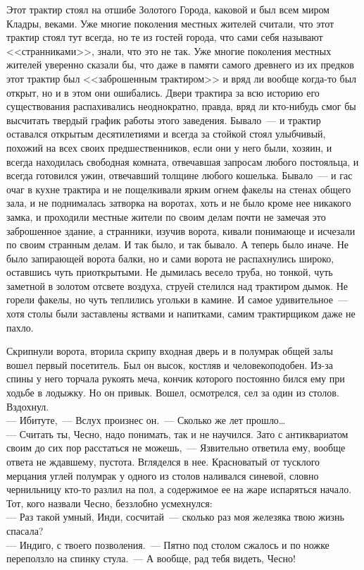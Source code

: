 Этот трактир стоял на отшибе Золотого Города, каковой и был всем миром Кладры, 
веками. Уже многие поколения местных жителей считали, что этот трактир стоял 
тут всегда, но те из гостей города, что сами себя называют <<странниками>>, знали, 
что это не так. Уже многие поколения местных жителей уверенно сказали бы, что даже 
в памяти самого древнего из их предков этот трактир был <<заброшенным трактиром>> 
и вряд ли вообще когда-то был открыт, но и в этом они ошибались. Двери трактира 
за всю историю его существования распахивались неоднократно, правда, вряд ли 
кто-нибудь смог бы высчитать твердый график работы этого заведения. Бывало~--- 
и трактир оставался открытым десятилетиями и всегда за стойкой стоял улыбчивый, 
похожий на всех своих предшественников, если они у него были, хозяин, и всегда 
находилась свободная комната, отвечавшая запросам любого постояльца, и всегда 
готовился ужин, отвечавший толщине любого кошелька. Бывало~--- и гас очаг в 
кухне трактира и не пощелкивали ярким огнем факелы на стенах общего зала, и не 
поднималась затворка на воротах, хоть и не было кроме нее никакого замка, и 
проходили местные жители по своим делам почти не замечая это заброшенное 
здание, а странники, изучив ворота, кивали понимающе и исчезали по своим странным 
делам. И так было, и так бывало. А теперь было иначе. Не было запирающей ворота балки, 
но и сами ворота не распахнулись широко, оставшись чуть приоткрытыми. Не 
дымилась весело труба, но тонкой, чуть заметной в золотом отсвете воздуха, 
струей стелился над трактиром дымок. Не горели факелы, но чуть теплились 
угольки в камине. И самое удивительное~--- хотя столы были заставлены яствами и 
напитками, самим трактирщиком даже не пахло.

Скрипнули ворота, вторила скрипу входная дверь и в полумрак общей залы вошел 
первый посетитель. Был он высок, костляв и человекоподобен. Из-за спины у него 
торчала рукоять меча, кончик которого постоянно бился ему при ходьбе в лодыжку. 
Но он привык. Вошел, осмотрелся, сел за один из столов. Вздохнул.\\
--- Ибитуте,~--- Вслух произнес он.~--- Сколько же лет прошло\ldots\\
--- Считать ты, Чесно, надо понимать, так и не научился. Зато с антиквариатом 
своим до сих пор расстаться не можешь,~--- Язвительно ответила ему, вообще 
ответа не ждавшему, пустота. Вгляделся в нее. Красноватый от тусклого мерцания углей 
полумрак у одного из столов наливался синевой, словно чернильницу кто-то разлил 
на пол, а содержимое ее на жаре испаряться начало. Тот, кого назвали Чесно, 
беззлобно усмехнулся:\\
--- Раз такой умный, Инди, сосчитай~--- сколько раз моя железяка твою жизнь 
спасала?\\
--- Индиго, с твоего позволения.~--- Пятно под столом сжалось и по ножке 
переползло на спинку стула.~--- А вообще, рад тебя видеть, Чесно!


